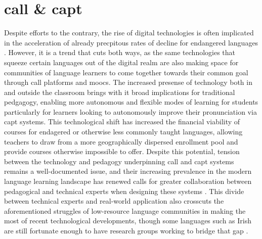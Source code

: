 \documentclass[thesis]{cluu}
\begin{document}
\section{\acrfull{call} \& \acrfull{capt}}
Despite efforts to the contrary, the rise of digital technologies is often implicated in the acceleration of already precpitous rates of decline for endangered languages \parencite[inter alia]{nichasaideCanWeDefuse2019,nichasaideSPEECHTECHNOLOGYDOCUMENTATION2015}. However, it is a trend that cuts both ways, as the same technologies that squeeze certain languages out of the digital realm are also making space for communities of language learners to come together towards their common goal through \gls{call} platforms and \gls{mooc}s. The increased presense of technology both in and outside the classroom brings with it broad implications for traditional pedgagogy, enabling more autonomous and flexible modes of learning for students \parencite{spolskyHandbookEducationalLinguistics2008} particularly for learners looking to autonomously improve their pronunciation via \gls{capt} systems. This technological shift has increased the financial viability of courses for endagered or otherwise less commonly taught languages, allowing teachers to draw from a more geographically dispersed enrollment pool and provide courses otherwise impossible to offer. Despite this potential, tension between the technology and pedagogy underpinning \gls{call} and \gls{capt} systems remains a well-documented issue, and their increasing prevalence in the modern language learning landscape has renewed calls for greater collaboration between pedagogical and technical experts when designing these systems \parencite{rogerson-revellComputerAssistedPronunciationTraining2021}. This divide between technical experts and real-world application also crosscuts the aforementioned struggles of low-resource language communities in making the most of recent technological developments, though some languages such as Irish are still fortunate enough to have research groups working to bridge that gap \parencite{nichiarainCorpasClisteCreating2022,nichiarainUsingSpeechNLP2022}.
\end{document}
